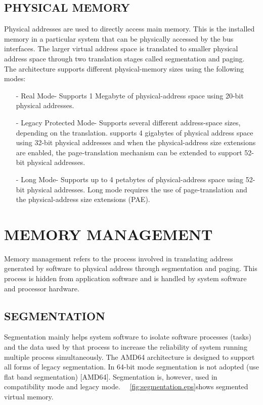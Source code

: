 \subsection {PHYSICAL MEMORY}
Physical addresses are used to directly access main memory. This is the installed memory in a particular system that can be physically accessed by the bus interfaces. The larger virtual address space is translated to smaller physical address space through two translation stages called segmentation and paging. The architecture supports different physical-memory sizes using the following modes:
\begin{itemize}

\item[-] Real Mode- Supports 1 Megabyte of physical-address space using 20-bit physical addresses.

\item[-] Legacy Protected Mode- Supports several different address-space sizes, depending on the translation. supports 4 gigabytes of physical address space using 32-bit physical addresses and when the physical-address size extensions are enabled, the page-translation mechanism can be extended to support 52-bit physical addresses.

\item[-] Long Mode- Supports up to 4 petabytes of physical-address space using 52-bit physical addresses. Long mode requires the use of page-translation and the physical-address size extensions (PAE).

\end{itemize}






\section{MEMORY MANAGEMENT}


Memory management refers to the process involved in translating address generated by software to physical address through segmentation and paging. This process is hidden from application software and is handled by system software and processor hardware. 


\subsection{SEGMENTATION} 
Segmentation mainly helps system software to isolate software processes (tasks) and the data used by that process to increase the reliability of system running multiple process simultaneously. The AMD64 architecture is designed to support all forms of legacy segmentation. In 64-bit mode segmentation is not adopted (use flat band segmentation) [AMD64]. Segmentation is, however, used in compatibility mode and legacy mode. 
~\figurename{~\ref{fig:segmentation.eps}}shows segmented virtual memory.

